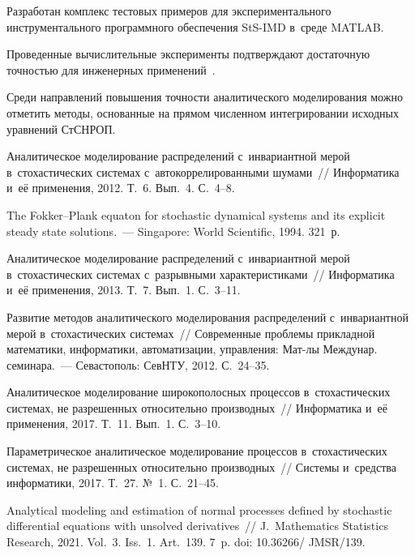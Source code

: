 \begin{multicols}{2}
Разработан комплекс тестовых примеров для экспериментального инструментального 
программного обеспечения StS-IMD в~среде MATLAB.

Проведенные вычислительные эксперименты подтверждают достаточную точностью 
для инженерных применений~\cite{11-sin, 12-sin}.

Среди направлений повышения точ\-ности аналитического моделирования можно
 отметить методы, основанные на прямом численном интегрировании исходных уравнений СтСНРОП.


{\small\frenchspacing
 {%
 \begin{thebibliography}{99}
 
 \vspace*{-3pt}
 
Аналитическое моделирование распределений с~инвариантной мерой в~стохастических системах с~автокоррелированными шумами~// Информатика 
и~её применения, 2012. Т.~6. Вып.~4. С.~4--8.

The Fokker--Plank equaton for stochastic dynamical systems and its explicit 
steady state solutions.~--- Singapore: World Scientific, 1994. 321~р.

Аналитическое моделирование распределений с~инвариантной мерой в~стохастических системах с~разрывными характеристиками~// 
Информатика и~её применения, 2013. Т.~7. Вып.~1. С.~3--11.

Развитие методов аналитического моделирования распределений с~инвариантной 
мерой в~стохастических сис\-те\-мах~// Современные проб\-ле\-мы 
при\-клад\-ной математики, информатики, автоматизации, управ\-ле\-ния: 
Мат-лы Междунар. семинара.~--- Севастополь: СевНТУ, 2012. С.~24--35.

Аналитическое моделирование широкополосных процессов в~стохастических системах, 
не разрешенных относительно производных~// Информатика и~её применения, 
2017. Т.~11. Вып.~1. С.~3--10.

Параметрическое аналитическое моделирование процессов в~стохастических  сис\-те\-мах, 
не разрешенных относительно производных~// Сис\-те\-мы и~средства 
информатики, 2017. Т.~27. №~1. С.~21--45.

Analytical modeling and estimation of normal processes defined by stochastic differential equations
 with unsolved derivatives~// 
J.~Mathematics Statistics Research, 2021. Vol.~3. Iss.~1. Art.~139. 7~p. doi: 10.36266/ \mbox{JMSR}/139.


\end{thebibliography}}}
\end{multicols}
